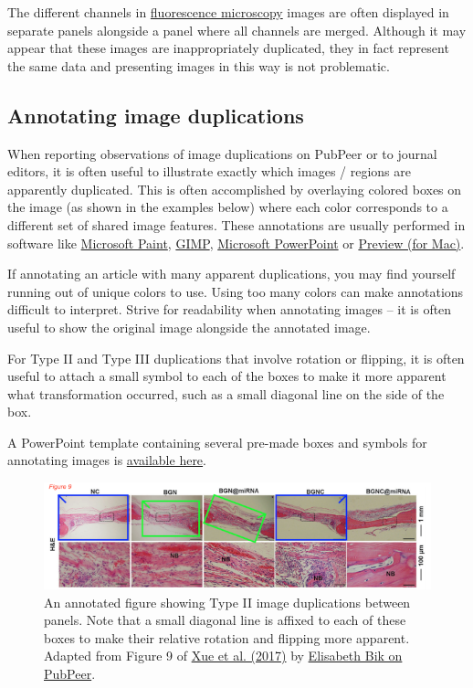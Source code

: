 \documentclass[letterpaper, 12pt]{article}
\begin{document}
The different channels in \href{https://en.wikipedia.org/wiki/Fluorescence_microscope}{fluorescence microscopy} images are often displayed in separate panels alongside a panel where all channels are merged. Although it may appear that these images are inappropriately duplicated, they in fact represent the same data and presenting images in this way is not problematic.

\subsection*{Annotating image duplications}

When reporting observations of image duplications on PubPeer or to journal editors, it is often useful to illustrate exactly which images / regions are apparently duplicated. This is often accomplished by overlaying colored boxes on the image (as shown in the examples below) where each color corresponds to a different set of shared image features. These annotations are usually performed in software like \href{https://www.microsoft.com/en-us/windows/paint}{Microsoft Paint}, \href{https://www.gimp.org/}{GIMP}, \href{https://www.microsoft.com/en-us/microsoft-365/powerpoint}{Microsoft PowerPoint} or \href{https://support.apple.com/guide/preview/welcome/mac}{Preview (for Mac)}. 

If annotating an article with many apparent duplications, you may find yourself running out of unique colors to use. Using too many colors can make annotations difficult to interpret. Strive for readability when annotating images -- it is often useful to show the original image alongside the annotated image.

For Type II and Type III duplications that involve rotation or flipping, it is often useful to attach a small symbol to each of the boxes to make it more apparent what transformation occurred, such as a small diagonal line on the side of the box. 

A PowerPoint template containing several pre-made boxes and symbols for annotating images is \href{https://osf.io/w3epj}{available here}.
\begin{figure}[h!tbp]
    \centering
    \includegraphics[width=\textwidth]{img/image_duplication/xue_fig_9_small.png}
    \caption*{An annotated figure showing Type II image duplications between panels. Note that a small diagonal line is affixed to each of these boxes to make their relative rotation and flipping more apparent. Adapted from Figure 9 of \href{https://doi.org/10.1002/adhm.201700630}{Xue et al. (2017)} by \href{https://pubpeer.com/publications/C47278BACD8304A719E502DF7041A5\#1}{Elisabeth Bik on PubPeer}.}
\end{figure}
\end{document}
